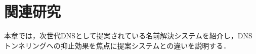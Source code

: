 \section{関連研究}
\label{sec:related-works}
本章では，次世代DNSとして提案されている名前解決システムを紹介し，DNSトンネリングへの抑止効果を焦点に提案システムとの違いを説明する．


